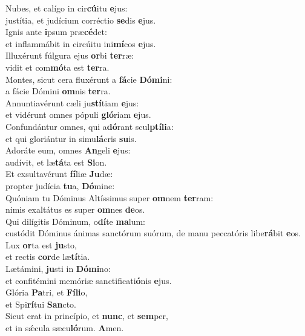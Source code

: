 \evenverse Nubes, et calígo in cir\textbf{cú}itu \textbf{e}jus:~\*\\
\evenverse justítia, et judícium corréctio \textbf{se}dis \textbf{e}jus.\\
\oddverse Ignis ante \textbf{i}psum præ\textbf{cé}det:~\*\\
\oddverse et inflammábit in circúitu ini\textbf{mí}cos \textbf{e}jus.\\
\evenverse Illuxérunt fúlgura ejus \textbf{or}bi \textbf{ter}ræ:~\*\\
\evenverse vidit et com\textbf{mó}ta est \textbf{ter}ra.\\
\oddverse Montes, sicut cera fluxérunt a \textbf{fá}cie \textbf{Dó}\textbf{mi}ni:~\*\\
\oddverse a fácie Dómini \textbf{om}nis \textbf{ter}ra.\\
\evenverse Annuntiavérunt cæli ju\textbf{stí}tiam \textbf{e}jus:~\*\\
\evenverse et vidérunt omnes pópuli \textbf{gló}riam \textbf{e}jus.\\
\oddverse Confundántur omnes, qui a\textbf{dó}rant scul\textbf{ptí}\textbf{li}a:~\*\\
\oddverse et qui gloriántur in simu\textbf{lá}cris \textbf{su}is.\\
\evenverse Adoráte eum, omnes \textbf{An}geli \textbf{e}jus:~\*\\
\evenverse audívit, et læ\textbf{tá}ta est \textbf{Si}on.\\
\oddverse Et exsultavérunt \textbf{fí}liæ \textbf{Ju}dæ:~\*\\
\oddverse propter judícia \textbf{tu}a, \textbf{Dó}mine:\\
\evenverse Quóniam tu Dóminus Altíssimus super \textbf{om}nem \textbf{ter}ram:~\*\\
\evenverse nimis exaltátus es super \textbf{om}nes \textbf{de}os.\\
\oddverse Qui dilígitis Dóminum, o\textbf{dí}te \textbf{ma}lum:~\*\\
\oddverse custódit Dóminus ánimas sanctórum suórum, de manu peccatóris libe\textbf{rá}bit \textbf{e}os.\\
\evenverse Lux \textbf{or}ta est \textbf{ju}sto,~\*\\
\evenverse et rectis \textbf{cor}de læ\textbf{tí}tia.\\
\oddverse Lætámini, \textbf{ju}sti in \textbf{Dó}\textbf{mi}no:~\*\\
\oddverse et confitémini memóriæ sanctificati\textbf{ó}nis \textbf{e}jus.\\
\evenverse Glória \textbf{Pa}tri, et \textbf{Fí}\textbf{li}o,~\*\\
\evenverse et Spi\textbf{rí}tui \textbf{San}cto.\\
\oddverse Sicut erat in princípio, et \textbf{nunc}, et \textbf{sem}per,~\*\\
\oddverse et in sǽcula sæcu\textbf{ló}rum. \textbf{A}men.\\
